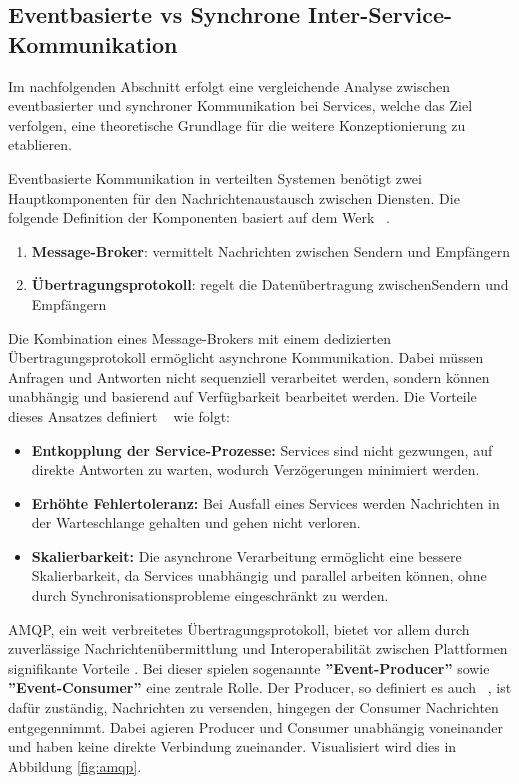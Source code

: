 \subsection{Eventbasierte vs Synchrone Inter-Service-Kommunikation}\label{subsec:eventdriven}
Im nachfolgenden Abschnitt erfolgt eine vergleichende Analyse zwischen eventbasierter und synchroner Kommunikation bei Services, welche das Ziel verfolgen, eine theoretische Grundlage für die weitere Konzeptionierung zu etablieren.

Eventbasierte Kommunikation in verteilten Systemen benötigt zwei Hauptkomponenten für den Nachrichtenaustausch zwischen Diensten. Die folgende Definition der Komponenten basiert auf dem Werk ~\parencite[vgl.][]{vitale}{}{}.

\begin{enumerate}
    \item \textbf{Message-Broker}: vermittelt Nachrichten zwischen Sendern und Empfängern
    \item \textbf{Übertragungsprotokoll}: regelt die Datenübertragung zwischen\newline Sendern und Empfängern
\end{enumerate}

Die Kombination eines Message-Brokers mit einem dedizierten Übertragungsprotokoll ermöglicht asynchrone Kommunikation. Dabei müssen Anfragen und Antworten nicht sequenziell verarbeitet werden, sondern können unabhängig und basierend auf Verfügbarkeit bearbeitet werden. Die Vorteile dieses Ansatzes definiert ~\parencite[vgl.][]{vitale}{}{} wie folgt:

 \begin{itemize}
  \item \textbf{Entkopplung der Service-Prozesse:} Services sind nicht gezwungen, auf direkte Antworten zu warten, wodurch Verzögerungen minimiert werden. 
  \item \textbf{Erhöhte Fehlertoleranz:} Bei Ausfall eines Services werden Nachrichten in der Warteschlange gehalten und gehen nicht verloren.
  \item \textbf{Skalierbarkeit:} Die asynchrone Verarbeitung ermöglicht eine bessere Skalierbarkeit, da Services unabhängig und parallel arbeiten können, ohne durch Synchronisationsprobleme eingeschränkt zu werden.
\end{itemize}

\ac{AMQP}, ein weit verbreitetes Übertragungsprotokoll, bietet vor allem durch zuverlässige Nachrichtenübermittlung und Interoperabilität zwischen Plattformen signifikante Vorteile \parencite[vgl.][]{vitale}. Bei dieser spielen sogenannte \textbf{''Event-Producer''} sowie \textbf{''Event-Consumer''} eine zentrale Rolle. Der Producer, so definiert es auch \citeauthor{vitale}~\parencite[vgl.][]{vitale}, ist dafür zuständig, Nachrichten zu versenden, hingegen der Consumer Nachrichten entgegennimmt. Dabei agieren Producer und Consumer unabhängig voneinander und haben keine direkte Verbindung zueinander. Visualisiert wird dies in Abbildung \ref{fig:amqp}.  
 
